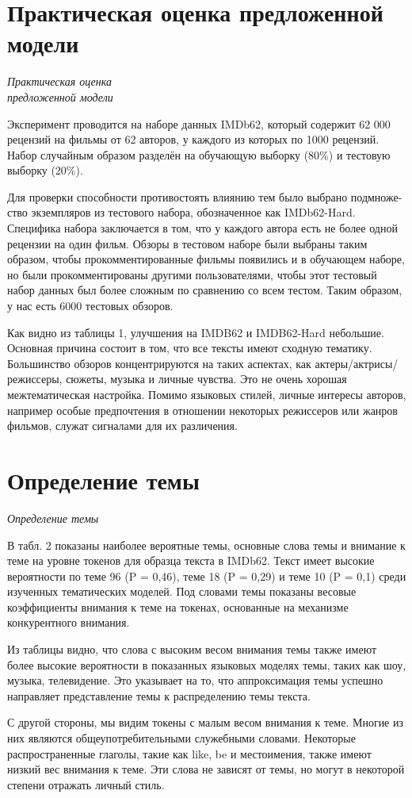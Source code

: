 \section{Практическая оценка предложенной модели}
\begin{center}
\emph{Практическая оценка}\\
\emph{предложенной модели}
\end{center}
\par Эксперимент проводится на наборе данных IMDb62, который содержит 
62 000 рецензий на фильмы от 62 авторов, 
у каждого из которых по 1000 рецензий. 
Набор случайным образом разделён на обучающую выборку (80\%) и тестовую выборку (20\%).
\par Для проверки способности противостоять влиянию тем было выбрано подмноже- ство экземпляров из тестового набора, обозначенное как IMDb62-Hard. Специфика 
набора заключается в том, что у каждого автора есть не более одной рецензии на один 
фильм. Обзоры в тестовом наборе были выбраны таким образом, чтобы прокомментированные фильмы появились и в обучающем наборе, 
но были прокомментированы другими пользователями, чтобы этот тестовый набор данных был более сложным 
по сравнению со всем тестом. Таким образом, у нас есть 6000 тестовых обзоров.
\par Как видно из таблицы 1, улучшения на IMDB62 и IMDB62-Hard небольшие. 
Основная причина состоит в том, что все 
тексты имеют сходную тематику. Большинство обзоров концентрируются на таких аспектах, как актеры/актрисы/режиссеры, сюжеты, музыка и личные чувства. 
Это не очень хорошая межтематическая настройка. Помимо языковых стилей, личные интересы авторов, 
например особые предпочтения в отношении некоторых режиссеров или жанров фильмов, служат сигналами для их различения.
\section{Определение темы}
\begin{center}
\emph{Определение темы}
\end{center}
\par В табл. 2 показаны наиболее вероятные 
темы, основные слова темы и внимание 
к теме на уровне токенов для образца текста 
в IMDb62. Текст имеет высокие вероятности по теме 96 (P = 0,46), теме 18 (P = 0,29) 
и теме 10 (P = 0,1) среди изученных тематических моделей. Под словами темы показаны весовые коэффициенты внимания к теме 
на токенах, основанные на механизме конкурентного внимания.
\par Из таблицы видно, что слова с высоким 
весом внимания темы также имеют более высокие вероятности в показанных языковых 
моделях темы, таких как шоу, музыка, телевидение. Это указывает на то, что аппроксимация темы успешно направляет представление темы к распределению темы текста.
\par С другой стороны, мы видим токены с малым весом внимания к теме. Многие из них 
являются общеупотребительными служебными словами. Некоторые распространенные 
глаголы, такие как like, be и местоимения, также имеют низкий вес внимания к теме. Эти 
слова не зависят от темы, но могут в некоторой степени отражать личный стиль.